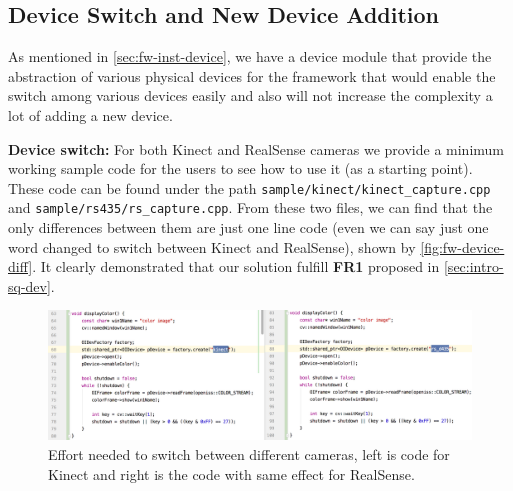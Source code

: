 
\subsection{Device Switch and New Device Addition}
\label{sec:Eval-framework-device}

As mentioned in \autoref{sec:fw-inst-device}, we have a device module that
provide
the abstraction of various physical devices for the framework that would enable
the switch among various devices easily and also will not increase the
complexity a lot of adding a new device.

\textbf{Device switch:}  For both Kinect and RealSense cameras we provide a
minimum working sample code for the users to see how to use it (as a starting
point). These code can be found under the path
\texttt{sample/kinect/kinect\_capture.cpp} and
\texttt{sample/rs435/rs\_capture.cpp}. From these two files, we can find that
the only differences between them are just one line code (even we can say
just one word changed to switch between Kinect and RealSense), shown by
\autoref{fig:fw-device-diff}. It clearly demonstrated that our solution
fulfill \textbf{FR1} proposed in \autoref{sec:intro-sq-dev}.

\begin{figure}
    \includegraphics[width=\linewidth]{figures/framework_device_diff.png}
    \caption[Effort needed to switch between different cameras]
    {Effort needed to switch between different cameras, left is code for Kinect
        and right is the code with same effect for RealSense.}
    \label{fig:fw-device-diff}
\end{figure}

